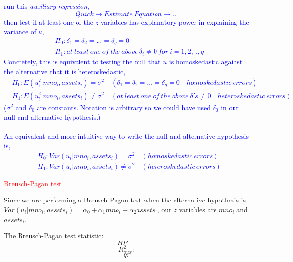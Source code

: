 \documentclass[12pt]{report}
\newenvironment{blueframed}[1][blue]
{\def\FrameCommand{\fboxsep=\FrameSep\fcolorbox{#1}{white}}%
\MakeFramed {\advance\hsize-\width \FrameRestore}}
{\endMakeFramed}
\begin{document}
\justify
\begin{blueframed}
	\vspace{-\baselineskip}
	\justify
	\noindent \textcolor{blue}
	{	\noindent run this \textit{auxiliary regression}, 
		$$Quick \to Estimate\ Equation \to \dots$$
		\noindent then test if at least one of the $z$ variables has explanatory power in explaining the variance of $u$,
		\begin{align*}
		&H_0: \delta_1 = \delta_2 = \dots = \delta_q = 0 \\
		&H_1:at\ least\ one\ of\ the\ above\ \delta_i \neq 0\ for\ i=1,2,..,q
		\end{align*}
		Concretely, this is equivalent to testing the null that $u$ is homoskedastic against the alternative that it is heteroskedastic,
		\begin{align*}
		&H_0: E(u^2_i|mno_i,assets_i) = \sigma^2 \quad (\delta_1 = \delta_2 = \dots = \delta_q = 0 \quad homoskedastic\ errors) \\
		&H_1: E(u^2_i|mno_i,assets_i) \neq \sigma^2 \quad (at\ least\ one\ of\ the\ above\ \delta's \neq 0 \quad heteroskedastic\ errors)
		\end{align*} ($\sigma^2$ and $\delta_0$ are constants. Notation is arbitrary so we could have used $\delta_0$ in our null and alternative hypothesis.) \\ \\ An equivalent and more intuitive way to write the null and alternative hypothesis is, \begin{align*}
		&H_0: Var(u_i|mno_i,assets_i) = \sigma^2 \quad (homoskedastic\ errors) \\
		&H_1: Var(u_i|mno_i,assets_i) \neq \sigma^2 \quad (heteroskedastic\ errors)
		\end{align*}
	}
\end{blueframed}

\noindent \textcolor{red}{Breusch-Pagan test}

\noindent Since we are performing a Breusch-Pagan test when the alternative hypothesis is $Var(u_i|mno_i , assets_i) = \alpha_0 + \alpha_1 mno_i + \alpha_2 assets_i$, our $z$ variables are $mno_i$ and $assets_i$, 



\newpage
\noindent The Breusch-Pagan test statistic:
$$BP =  $$ $$R^2_{aux}:$$ $$q:$$
\end{document}
